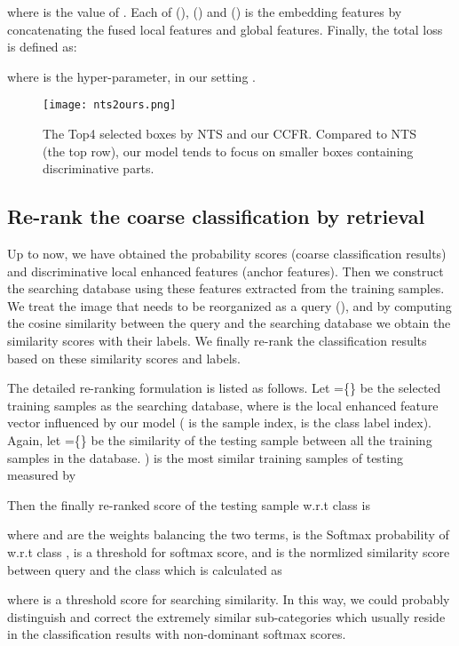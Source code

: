 \documentclass[10pt,twocolumn,letterpaper]{article}
\begin{document}
where  is the value of .
Each of (), () and () is the embedding features by concatenating the fused local features and global features.
Finally, the total loss is defined as:

where  is the hyper-parameter, in our setting . 


\begin{figure*}[t]
\begin{center}
\texttt{[image: nts2ours.png]}
\end{center}
   \caption{The Top4 selected boxes by NTS and our CCFR. Compared to NTS (the top row), our model tends to focus on smaller boxes containing discriminative parts.}
\label{nts2ours}
\end{figure*}
\subsection{Re-rank the coarse classification by retrieval}

Up to now, we have obtained the  probability scores (coarse classification results) and discriminative local enhanced features (anchor  features). Then we construct the searching database using these features extracted from the training samples. We treat the image that needs to be reorganized as a query (), and by computing the cosine similarity between the query and the searching database we obtain the  similarity scores with their labels. We finally re-rank the classification results based on these similarity scores and labels. 

The detailed re-ranking formulation is listed as follows.
Let =\{\} be the selected training samples as the searching database, where  is the local enhanced feature vector influenced by our model ( is the sample index,  is the class label index).
Again, let =\{\} be the similarity of the testing sample  between all the training samples in the database. ) is the most similar  training samples of testing  measured by 

Then the finally re-ranked score of the testing sample  w.r.t class  is



where  and  are the weights balancing the two terms,  is the Softmax probability of  w.r.t class ,  is a threshold for softmax score, and  is the normlized similarity score between query and the class  which is calculated as 

where  is a threshold score for searching similarity.
In this way, we could probably distinguish and correct the extremely similar sub-categories which usually reside in the  classification results with non-dominant softmax scores.
\end{document}
